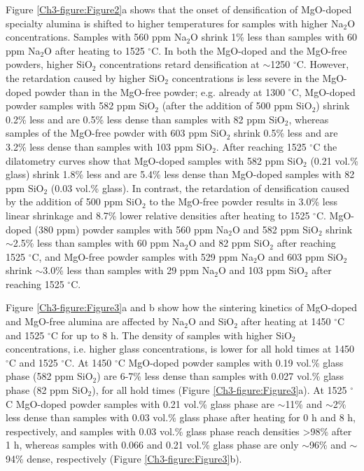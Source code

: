 Figure \ref{Ch3-figure:Figure2}a shows that the onset of densification of MgO-doped specialty alumina is shifted to higher temperatures for samples with higher Na$_{2}$O concentrations. Samples with 560 ppm Na$_{2}$O shrink 1\% less than samples with 60 ppm Na$_{2}$O after heating to 1525 $^{\circ}$C. In both the MgO-doped and the MgO-free powders, higher SiO$_{2}$ concentrations retard densification at $\sim$1250 $^{\circ}$C. However, the retardation caused by higher SiO$_{2}$ concentrations is less severe in the MgO-doped powder than in the MgO-free powder; e.g. already at 1300 $^{\circ}$C, MgO-doped powder samples with 582 ppm SiO$_{2}$ (after the addition of 500 ppm SiO$_{2}$) shrink 0.2\% less and are 0.5\% less dense than samples with 82 ppm SiO$_{2}$, whereas samples of the MgO-free powder with 603 ppm SiO$_{2}$ shrink 0.5\% less and are 3.2\% less dense than samples with 103 ppm SiO$_{2}$. After reaching 1525 $^{\circ}$C the dilatometry curves show that MgO-doped samples with 582 ppm SiO$_{2}$ (0.21 vol.\% glass) shrink 1.8\% less and are 5.4\% less dense than MgO-doped samples with 82 ppm SiO$_{2}$ (0.03 vol.\% glass). In contrast, the retardation of densification caused by the addition of 500 ppm SiO$_{2}$ to the MgO-free powder results in 3.0\% less linear shrinkage and 8.7\% lower relative densities after heating to 1525 $^{\circ}$C. MgO-doped (380 ppm) powder samples with 560 ppm Na$_{2}$O and 582 ppm SiO$_{2}$ shrink $\sim$2.5\% less than samples with 60 ppm Na$_{2}$O and 82 ppm SiO$_{2}$ after reaching 1525 $^{\circ}$C, and MgO-free powder samples with 529 ppm Na$_{2}$O and 603 ppm SiO$_{2}$ shrink $\sim$3.0\% less than samples with 29 ppm Na$_{2}$O and 103 ppm SiO$_{2}$ after reaching 1525 $^{\circ}$C.

Figure \ref{Ch3-figure:Figure3}a and b show how the sintering kinetics of MgO-doped and MgO-free \cite{Frueh2016} alumina are affected by Na$_{2}$O and SiO$_{2}$ after heating at 1450 $^{\circ}$C and 1525 $^{\circ}$C for up to 8 h. The density of samples with higher SiO$_{2}$ concentrations, i.e. higher glass concentrations, is lower for all hold times at 1450 $^{\circ}$C and 1525 $^{\circ}$C. At 1450 $^{\circ}$C MgO-doped powder samples with 0.19 vol.\% glass phase (582 ppm SiO$_{2}$) are 6-7\% less dense than samples with 0.027 vol.\% glass phase (82 ppm SiO$_{2}$), for all hold times (Figure \ref{Ch3-figure:Figure3}a). At 1525 $^{\circ}$C MgO-doped powder samples with 0.21 vol.\% glass phase are $\sim$11\% and $\sim$2\% less dense than samples with 0.03 vol.\% glass phase after heating for 0 h and 8 h, respectively, and samples with 0.03 vol.\% glass phase reach densities >98\% after 1 h, whereas samples with 0.066 and 0.21 vol.\% glass phase are only $\sim$96\% and $\sim$94\% dense, respectively (Figure \ref{Ch3-figure:Figure3}b). 


